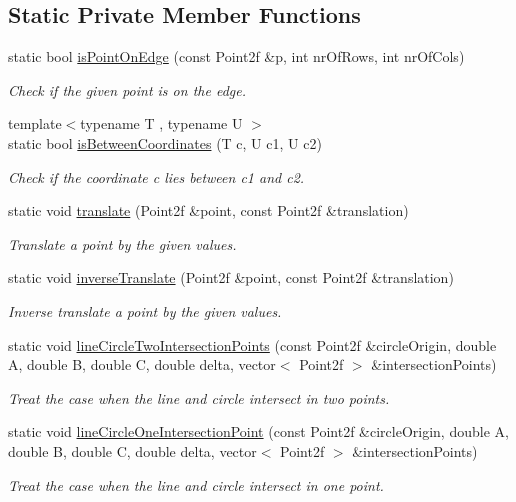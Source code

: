 \subsection*{Static Private Member Functions}
\begin{DoxyCompactItemize}
\item 
static bool \hyperlink{classmultiscale_1_1Geometry2D_a4a6aba3c69956a83af5d81f4d087c205}{is\-Point\-On\-Edge} (const Point2f \&p, int nr\-Of\-Rows, int nr\-Of\-Cols)
\begin{DoxyCompactList}\small\item\em Check if the given point is on the edge. \end{DoxyCompactList}\item 
{\footnotesize template$<$typename T , typename U $>$ }\\static bool \hyperlink{classmultiscale_1_1Geometry2D_a3574944f4c4a7cb422bc01b92330d862}{is\-Between\-Coordinates} (T c, U c1, U c2)
\begin{DoxyCompactList}\small\item\em Check if the coordinate c lies between c1 and c2. \end{DoxyCompactList}\item 
static void \hyperlink{classmultiscale_1_1Geometry2D_ae7299287a17f8cd47e8d84e19ddbe0e9}{translate} (Point2f \&point, const Point2f \&translation)
\begin{DoxyCompactList}\small\item\em Translate a point by the given values. \end{DoxyCompactList}\item 
static void \hyperlink{classmultiscale_1_1Geometry2D_a7a7526398a9675a05c609bb442fe02f0}{inverse\-Translate} (Point2f \&point, const Point2f \&translation)
\begin{DoxyCompactList}\small\item\em Inverse translate a point by the given values. \end{DoxyCompactList}\item 
static void \hyperlink{classmultiscale_1_1Geometry2D_ae501398552bf50acfd23c04db8d65300}{line\-Circle\-Two\-Intersection\-Points} (const Point2f \&circle\-Origin, double A, double B, double C, double delta, vector$<$ Point2f $>$ \&intersection\-Points)
\begin{DoxyCompactList}\small\item\em Treat the case when the line and circle intersect in two points. \end{DoxyCompactList}\item 
static void \hyperlink{classmultiscale_1_1Geometry2D_ad9a4555568f44ef912601d669ef94e03}{line\-Circle\-One\-Intersection\-Point} (const Point2f \&circle\-Origin, double A, double B, double C, double delta, vector$<$ Point2f $>$ \&intersection\-Points)
\begin{DoxyCompactList}\small\item\em Treat the case when the line and circle intersect in one point. \end{DoxyCompactList}\end{DoxyCompactItemize}


